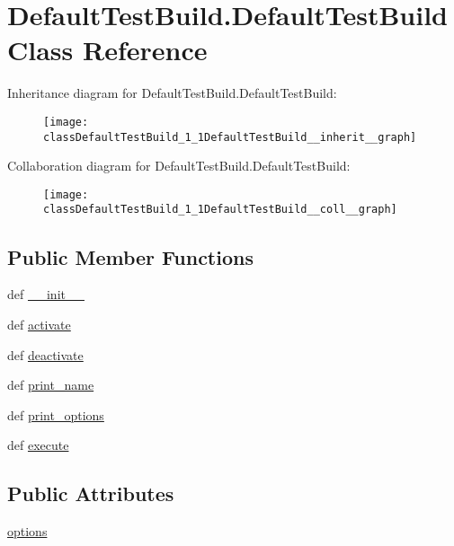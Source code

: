 \hypertarget{classDefaultTestBuild_1_1DefaultTestBuild}{\section{Default\-Test\-Build.\-Default\-Test\-Build Class Reference}
\label{classDefaultTestBuild_1_1DefaultTestBuild}
}


Inheritance diagram for Default\-Test\-Build.\-Default\-Test\-Build\-:\nopagebreak
\begin{figure}[H]
\begin{center}
\leavevmode
\texttt{[image: classDefaultTestBuild\_1\_1DefaultTestBuild\_\_inherit\_\_graph]}
\end{center}
\end{figure}


Collaboration diagram for Default\-Test\-Build.\-Default\-Test\-Build\-:\nopagebreak
\begin{figure}[H]
\begin{center}
\leavevmode
\texttt{[image: classDefaultTestBuild\_1\_1DefaultTestBuild\_\_coll\_\_graph]}
\end{center}
\end{figure}
\subsection*{Public Member Functions}
\begin{DoxyCompactItemize}
\item 
def \hyperlink{classDefaultTestBuild_1_1DefaultTestBuild_a08729e27591861a8c9b61a6b2618ec2f}{\-\_\-\-\_\-init\-\_\-\-\_\-}
\item 
def \hyperlink{classDefaultTestBuild_1_1DefaultTestBuild_a88b530e5d66e5dc310f77087d8744345}{activate}
\item 
def \hyperlink{classDefaultTestBuild_1_1DefaultTestBuild_a3a1fbc64d9a4750d7ecf722fb6bcd1ce}{deactivate}
\item 
def \hyperlink{classDefaultTestBuild_1_1DefaultTestBuild_a391c37a5d652ad857c57ae07b66b0d7e}{print\-\_\-name}
\item 
def \hyperlink{classDefaultTestBuild_1_1DefaultTestBuild_a38238916f0726d3a8e2b352ddc74f424}{print\-\_\-options}
\item 
def \hyperlink{classDefaultTestBuild_1_1DefaultTestBuild_a17ce5f679320871748b5aa3ea3491c28}{execute}
\end{DoxyCompactItemize}
\subsection*{Public Attributes}
\begin{DoxyCompactItemize}
\item 
\hyperlink{classDefaultTestBuild_1_1DefaultTestBuild_a2c22896be00540cc15625e79bc98c9fc}{options}
\end{DoxyCompactItemize}


